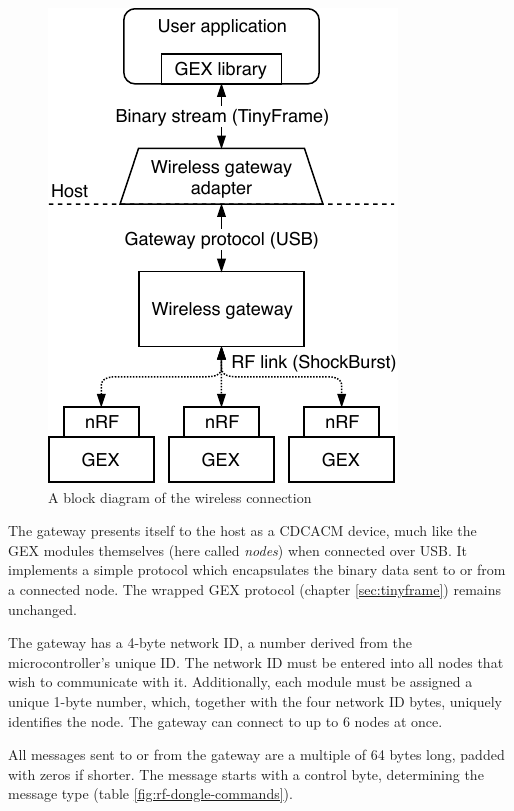 \begin{figure}
	\vspace{-1em}
	\centering
	\includegraphics[scale=0.9]{img/rf-gw.pdf}
	\caption{A block diagram of the wireless connection}
\end{figure}

The gateway presents itself to the host as a \gls{CDCACM} device, much like the GEX modules themselves (here called \textit{nodes}) when connected over \gls{USB}. It implements a simple protocol which encapsulates the binary data sent to or from a connected node. The wrapped GEX protocol (chapter \ref{sec:tinyframe}) remains unchanged.

The gateway has a 4-byte network ID, a number derived from the microcontroller's unique ID. The network ID must be entered into all nodes that wish to communicate with it. Additionally, each module must be assigned a unique 1-byte number, which, together with the four network ID bytes, uniquely identifies the node. The gateway can connect to up to 6 nodes at once.

All messages sent to or from the gateway are a multiple of 64 bytes long, padded with zeros if shorter. The message starts with a control byte, determining the message type (table \ref{fig:rf-dongle-commands}).

